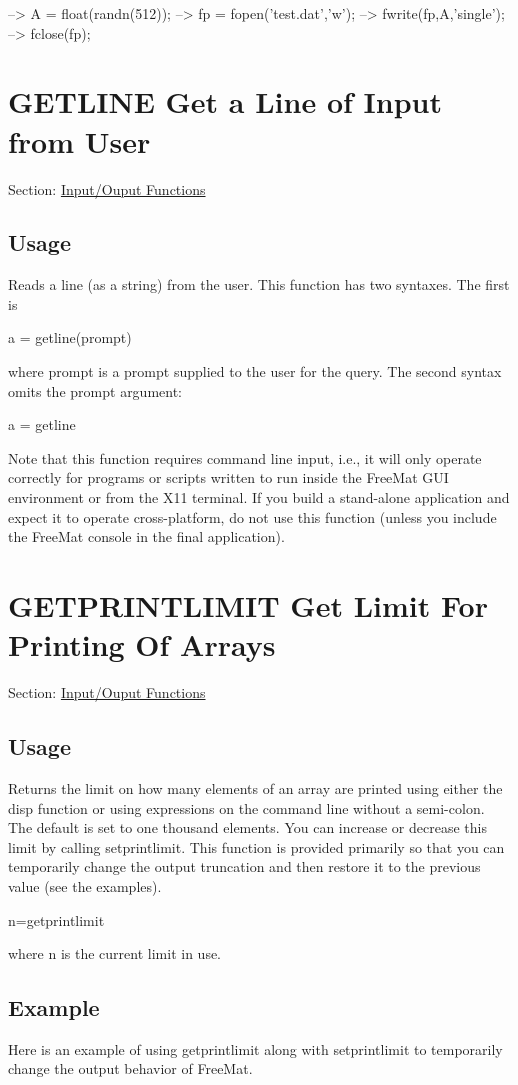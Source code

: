 \begin{DoxyVerbInclude}
--> A = float(randn(512));
--> fp = fopen('test.dat','w');
--> fwrite(fp,A,'single');
--> fclose(fp);
\end{DoxyVerbInclude}
 \hypertarget{io_getline}{}\section{G\-E\-T\-L\-I\-N\-E Get a Line of Input from User}\label{io_getline}
Section\-: \hyperlink{sec_io}{Input/\-Ouput Functions} \hypertarget{vtkwidgets_vtkxyplotwidget_Usage}{}\subsection{Usage}\label{vtkwidgets_vtkxyplotwidget_Usage}
Reads a line (as a string) from the user. This function has two syntaxes. The first is \begin{DoxyVerb}  a = getline(prompt)
\end{DoxyVerb}
 where {\ttfamily prompt} is a prompt supplied to the user for the query. The second syntax omits the {\ttfamily prompt} argument\-: \begin{DoxyVerb}  a = getline
\end{DoxyVerb}
 Note that this function requires command line input, i.\-e., it will only operate correctly for programs or scripts written to run inside the Free\-Mat G\-U\-I environment or from the X11 terminal. If you build a stand-\/alone application and expect it to operate cross-\/platform, do not use this function (unless you include the Free\-Mat console in the final application). \hypertarget{io_getprintlimit}{}\section{G\-E\-T\-P\-R\-I\-N\-T\-L\-I\-M\-I\-T Get Limit For Printing Of Arrays}\label{io_getprintlimit}
Section\-: \hyperlink{sec_io}{Input/\-Ouput Functions} \hypertarget{vtkwidgets_vtkxyplotwidget_Usage}{}\subsection{Usage}\label{vtkwidgets_vtkxyplotwidget_Usage}
Returns the limit on how many elements of an array are printed using either the {\ttfamily disp} function or using expressions on the command line without a semi-\/colon. The default is set to one thousand elements. You can increase or decrease this limit by calling {\ttfamily setprintlimit}. This function is provided primarily so that you can temporarily change the output truncation and then restore it to the previous value (see the examples). \begin{DoxyVerb}   n=getprintlimit
\end{DoxyVerb}
 where {\ttfamily n} is the current limit in use. \hypertarget{variables_struct_Example}{}\subsection{Example}\label{variables_struct_Example}
Here is an example of using {\ttfamily getprintlimit} along with {\ttfamily setprintlimit} to temporarily change the output behavior of Free\-Mat.


